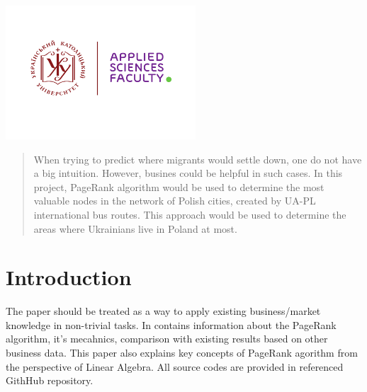 \begin{titlepage}

\includegraphics[height=5cm]{UCU-Apps.png}\\[1cm] %
 

\vfill %

\end{titlepage}

\cleardoublepage
{}
\tableofcontents
\cleardoublepage
{}

\begin{abstract}
When trying to predict where migrants would settle down, one do not have a big intuition. However, busines could be helpful in such cases. In this project, PageRank algorithm would be used to determine the most valuable nodes in the network of Polish cities, created by UA-PL international bus routes. This approach would be used to determine the areas where Ukrainians live in Poland at most.
\end{abstract}

\section{Introduction}

The paper should be treated as a way to apply existing business/market knowledge in non-trivial tasks. 
In contains information about the PageRank algorithm, it's mecahnics, comparison with existing results based on other business data.
\newline
This paper also explains key concepts of PageRank agorithm from the perspective of Linear Algebra. All source codes are provided in referenced GithHub repository.

